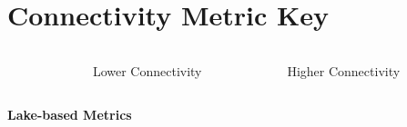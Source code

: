 \documentclass[bigger]{beamer}
\begin{document}

\section{Connectivity Metric Key}
\begin{frame}
  \begin{center}

    \begin{columns} [c]     
      \begin{column}{0.4\textwidth}        
      \end{column}
  
    \begin{column}{0.25\textwidth}
      \huge{Lower Connectivity}
    \end{column}
    
    \begin{column}{0.25\textwidth}
      \huge{Higher Connectivity}
    \end{column}
    \end{columns}

  \begin{columns}    
    \begin{column}[b]{0.4\textwidth}
      \vspace{4em}
    \end{column}

  \begin{column}[b]{0.25\textwidth}
  \end{column}
  
  \begin{column}[b]{0.25\textwidth}
  \end{column}
  \end{columns}

  \begin{columns}    
    \begin{column}[b]{0.4\textwidth}
      \huge{\textbf{Lake-based Metrics}}
    \end{column}

  \begin{column}[b]{0.25\textwidth}
  \end{column}
  
  \begin{column}[b]{0.25\textwidth}
  \end{column}
  \end{columns}
  

\end{center}
\end{frame}
\end{document}
